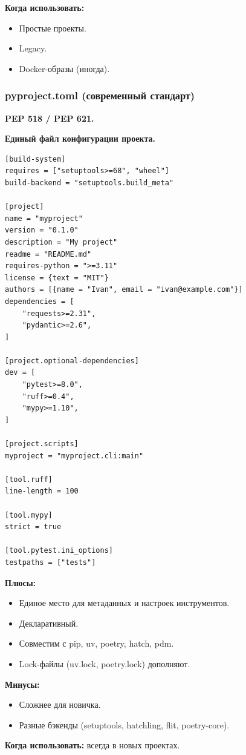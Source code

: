 \textbf{Когда использовать:}
\begin{itemize}
\item Простые проекты.
\item Legacy.
\item Docker-образы (иногда).
\end {itemize}

\subsubsection{ pyproject.toml (современный стандарт)}
\textbf{PEP 518 / PEP 621.}

\textbf{Единый файл конфигурации проекта.}
\begin{lstlisting}
[build-system]
requires = ["setuptools>=68", "wheel"]
build-backend = "setuptools.build_meta"

[project]
name = "myproject"
version = "0.1.0"
description = "My project"
readme = "README.md"
requires-python = ">=3.11"
license = {text = "MIT"}
authors = [{name = "Ivan", email = "ivan@example.com"}]
dependencies = [
    "requests>=2.31",
    "pydantic>=2.6",
]

[project.optional-dependencies]
dev = [
    "pytest>=8.0",
    "ruff>=0.4",
    "mypy>=1.10",
]

[project.scripts]
myproject = "myproject.cli:main"

[tool.ruff]
line-length = 100

[tool.mypy]
strict = true

[tool.pytest.ini_options]
testpaths = ["tests"]
\end{lstlisting}

\textbf{Плюсы:}
\begin{itemize}
\item Единое место для метаданных и настроек инструментов.
\item Декларативный.
\item Совместим с pip, uv, poetry, hatch, pdm.
\item Lock-файлы (uv.lock, poetry.lock) дополняют.
\end{itemize}
\textbf{Минусы:}
\begin{itemize}
\item Сложнее для новичка.
\item Разные бэкенды (setuptools, hatchling, flit, poetry-core).
\end{itemize}
\begin{warningbox2}
\textbf{Когда использовать:} всегда в новых проектах.
\end{warningbox2}
